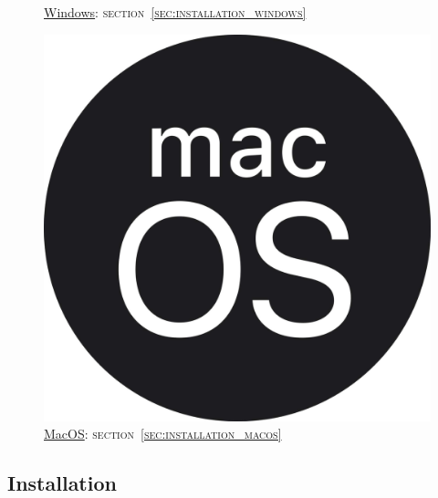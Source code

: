 \documentclass[internal]{nhitec_design}
\begin{document}
\begin{figure}[!h]
\begin{minipage}{0.32\textwidth}
        \caption*{\underline{Windows}: \textsc{section~\ref{sec:installation_windows}}}
    \end{minipage}
    \begin{minipage}{0.32\textwidth}
        \centering
        
        \includegraphics[scale=0.025]{Images_formation/MacosLogo.pdf}
        \caption*{\underline{MacOS}: \textsc{section~\ref{sec:installation_macos}}}
    \end{minipage}
\end{figure}

    \subsection[Installation Linux]{Installation \linux{}\label{sec:installation_linux}}
\end{document}
